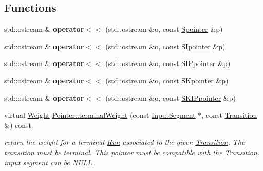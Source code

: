 \subsection*{Functions}
\begin{DoxyCompactItemize}
\item 
\mbox{\label{group__table_gad263d9daed9b87d43b2197cac98bced2}} 
std\+::ostream \& {\bfseries operator$<$$<$} (std\+::ostream \&o, const \mbox{\hyperlink{classSpointer}{Spointer}} \&p)
\item 
\mbox{\label{group__table_ga86a37eaf8509fee42b0cecf04740db9b}} 
std\+::ostream \& {\bfseries operator$<$$<$} (std\+::ostream \&o, const \mbox{\hyperlink{classSIpointer}{S\+Ipointer}} \&p)
\item 
\mbox{\label{group__table_ga7576e987b23cc05f8c50602b5fbe5fe3}} 
std\+::ostream \& {\bfseries operator$<$$<$} (std\+::ostream \&o, const \mbox{\hyperlink{classSIPpointer}{S\+I\+Ppointer}} \&p)
\item 
\mbox{\label{group__table_ga408ad7443ca740b3f261b7ef920bc26f}} 
std\+::ostream \& {\bfseries operator$<$$<$} (std\+::ostream \&o, const \mbox{\hyperlink{classSKpointer}{S\+Kpointer}} \&p)
\item 
\mbox{\label{group__table_ga015154c0d3f197a32544c20ea2f70c10}} 
std\+::ostream \& {\bfseries operator$<$$<$} (std\+::ostream \&o, const \mbox{\hyperlink{classSKIPpointer}{S\+K\+I\+Ppointer}} \&p)
\item 
\mbox{\label{group__table_ga4ca596fe52abd36d550a10818678d54c}} 
virtual \mbox{\hyperlink{classWeight}{Weight}} \mbox{\hyperlink{group__table_ga4ca596fe52abd36d550a10818678d54c}{Pointer\+::terminal\+Weight}} (const \mbox{\hyperlink{classInputSegment}{Input\+Segment}} $\ast$, const \mbox{\hyperlink{classTransition}{Transition}} \&) const
\begin{DoxyCompactList}\small\item\em return the weight for a terminal \mbox{\hyperlink{classRun}{Run}} associated to the given \mbox{\hyperlink{classTransition}{Transition}}. The transition must be terminal. This pointer must be compatible with the \mbox{\hyperlink{classTransition}{Transition}}. input segment can be N\+U\+LL. \end{DoxyCompactList}\item 

\end{DoxyCompactItemize}
